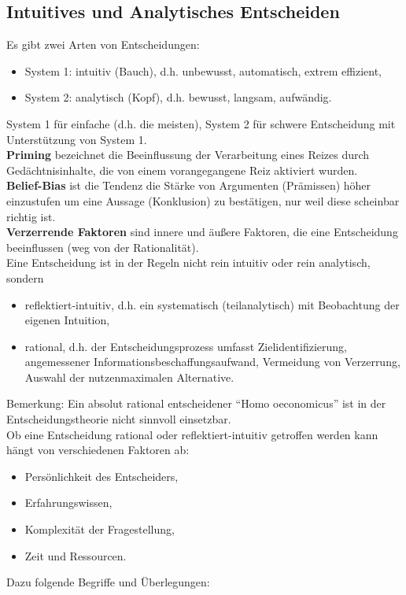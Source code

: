 \subsection{Intuitives und Analytisches Entscheiden}
Es gibt zwei Arten von Entscheidungen:
\begin{itemize}
	\item System 1: intuitiv (Bauch), d.h. unbewusst, automatisch, extrem effizient,
	\item System 2: analytisch (Kopf), d.h. bewusst, langsam, aufwändig.
\end{itemize}
System 1 für einfache (d.h. die meisten), System 2 für schwere Entscheidung mit Unterstützung von System 1.\\
\textbf{Priming} bezeichnet die Beeinflussung der Verarbeitung eines Reizes durch Gedächtnisinhalte, die von einem vorangegangene Reiz aktiviert wurden.\\
\textbf{Belief-Bias} ist die Tendenz die Stärke von Argumenten (Prämissen) höher einzustufen um eine Aussage (Konklusion) zu bestätigen, nur weil diese scheinbar richtig ist.\\
\textbf{Verzerrende Faktoren} sind innere und äußere Faktoren, die eine Entscheidung beeinflussen (weg von der Rationalität).
\ \\
Eine Entscheidung ist in der Regeln nicht rein intuitiv oder rein analytisch, sondern
\begin{itemize}
	\item reflektiert-intuitiv, d.h. ein systematisch (teilanalytisch) mit Beobachtung der eigenen Intuition,
	\item rational, d.h. der Entscheidungsprozess umfasst Zielidentifizierung, angemessener Informationsbeschaffungsaufwand, Vermeidung von Verzerrung, Auswahl der nutzenmaximalen Alternative.
\end{itemize}
Bemerkung: Ein absolut rational entscheidener ``Homo oeconomicus'' ist in der Entscheidungstheorie nicht sinnvoll einsetzbar.\\
Ob eine Entscheidung rational oder reflektiert-intuitiv getroffen werden kann hängt von verschiedenen Faktoren ab:
\begin{itemize}
	\item Persönlichkeit des Entscheiders,
	\item Erfahrungswissen,
	\item Komplexität der Fragestellung,
	\item Zeit und Ressourcen.
\end{itemize}
Dazu folgende Begriffe und Überlegungen:\\

